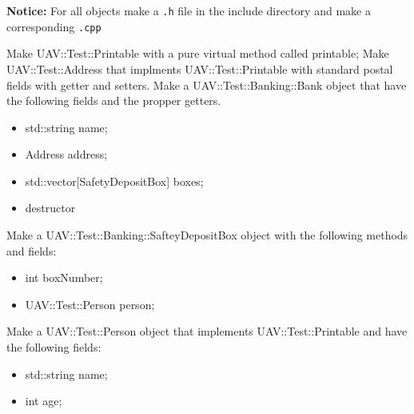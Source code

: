 \documentclass[10pt]{exam}
\begin{document}
\newpage

\textbf{Notice:} For all objects make a \lstinline{.h} file in the include directory and make a corresponding \lstinline{.cpp}
\begin{questions}
\question Make UAV::Test::Printable with a pure virtual method called printable;
\question Make UAV::Test::Address that implments UAV::Test::Printable with standard postal fields with getter and setters.
\question Make a UAV::Test::Banking::Bank object that have the following fields and the propper getters.
\begin{itemize}
\item std::string name;
\item Address address;
\item std::vector[SafetyDepositBox] boxes;
\item destructor
\end{itemize}

\question Make a UAV::Test::Banking::SafteyDepositBox object with the following methods and fields:
\begin{itemize}
\item int boxNumber;
\item UAV::Test::Person person;
\end{itemize}

\question Make a UAV::Test::Person object that implements UAV::Test::Printable and have the following fields:
\begin{itemize}
\item std::string name;
\item int age;
\end{itemize}
\end{questions}
\end{document}

